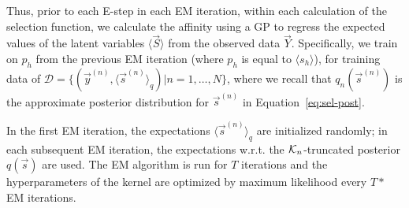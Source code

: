 Thus, prior to each E-step in each EM iteration, within each calculation of the selection function, we calculate the affinity  using a GP to regress the expected values of the latent variables $\langle \vec{S} \rangle$ from the observed data $\vec{Y}$.  
Specifically, we train on $p_h$ from the previous EM iteration (where $p_h$ is equal to $\langle s_h \rangle$), for 
training data of 
$\mathcal{D} = \{ (\vec{y}^{(n)}, \langle\vec{s}^{(n)}\rangle_{q}) | n = 1,\dots, N \}$, 
where we recall that $q_{n}(\vec{s}^{(n)})$ is the approximate posterior distribution for $\vec{s}^{(n)}$ in Equation~\eqref{eq:sel-post}.
%

In the first EM iteration, the expectations $\langle\vec{s}^{(n)}\rangle_{q}$ are initialized randomly;
in each subsequent EM iteration, the %
expectations w.r.t. the $\mathcal{K}_{n}$-truncated posterior $q(\vec{s})$ are used. 
The EM algorithm is run for $T$ iterations and the hyperparameters of the kernel are optimized by maximum likelihood every $T\ast$ EM iterations.

